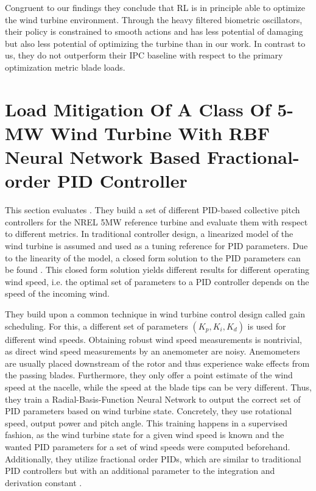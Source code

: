 Congruent to our findings they conclude that RL is in principle able to optimize the wind turbine environment. Through the heavy filtered biometric oscillators, their policy is constrained to smooth actions and has less potential of damaging but also less potential of optimizing the turbine than in our work. In contrast to us, they do not outperform their IPC baseline with respect to the primary optimization metric blade loads.

\section{Load Mitigation Of A Class Of 5-MW Wind Turbine With RBF Neural Network
Based Fractional-order PID Controller}
\label{section:related-asgharnia}

This section evaluates \citet{asgharniaLoadMitigationClass2020}. They build a set of different PID-based collective pitch controllers for the NREL 5MW reference turbine \cite{jonkmanDefinition5MWReference2009} and evaluate them with respect to different metrics. In traditional controller design, a linearized model of the wind turbine is assumed and used as a tuning reference for PID parameters. Due to the linearity of the model, a closed form solution to the PID parameters can be found \cite[Eq 12 - 22]{asgharniaLoadMitigationClass2020}. This closed form solution yields different results for different operating wind speed, i.e. the optimal set of parameters to a PID controller depends on the speed of the incoming wind.

They build upon a common technique in wind turbine control design called gain scheduling. For this, a different set of parameters $(K_p, K_i, K_d)$ is used for different wind speeds. Obtaining robust wind speed measurements is nontrivial, as direct wind speed measurements by an anemometer are noisy. Anemometers are usually placed downstream of the rotor and thus experience wake effects from the passing blades. Furthermore, they only offer a point estimate of the wind speed at the nacelle, while the speed at the blade tips can be very different. Thus, they train a Radial-Basis-Function Neural Network to output the correct set of PID parameters based on wind turbine state. Concretely, they use rotational speed, output power and pitch angle. This training happens in a supervised fashion, as the wind turbine state for a given wind speed is known and the wanted PID parameters for a set of wind speeds were computed beforehand. Additionally, they utilize fractional order PIDs, which are similar to traditional PID controllers but with an additional parameter to the integration and derivation constant \cite[equation 24]{asgharniaLoadMitigationClass2020}.

